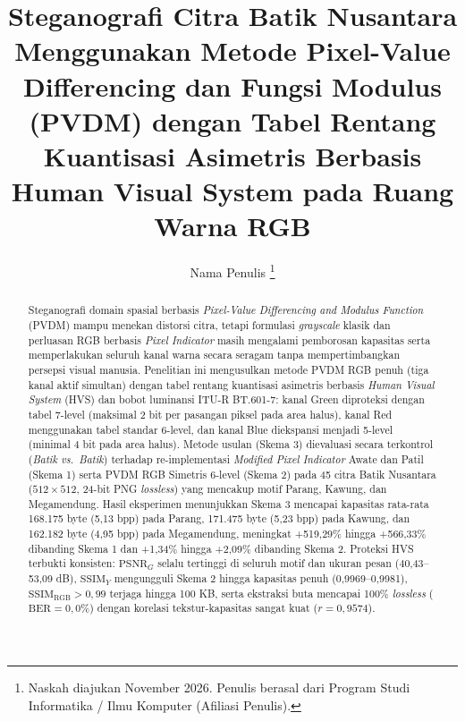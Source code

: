 \documentclass[12pt,journal]{IEEEtran}
\begin{document}
\title{Steganografi Citra Batik Nusantara Menggunakan Metode Pixel-Value Differencing dan Fungsi Modulus (PVDM) dengan Tabel Rentang Kuantisasi Asimetris Berbasis Human Visual System pada Ruang Warna RGB}

\author{Nama Penulis%
\thanks{Naskah diajukan November 2026. Penulis berasal dari Program Studi Informatika / Ilmu Komputer (Afiliasi Penulis).}}

\maketitle

\begin{abstract}
Steganografi domain spasial berbasis \textit{Pixel-Value Differencing and Modulus Function} (PVDM) mampu menekan distorsi citra, tetapi formulasi \textit{grayscale} klasik dan perluasan RGB berbasis \textit{Pixel Indicator} masih mengalami pemborosan kapasitas serta memperlakukan seluruh kanal warna secara seragam tanpa mempertimbangkan persepsi visual manusia. Penelitian ini mengusulkan metode PVDM RGB penuh (tiga kanal aktif simultan) dengan tabel rentang kuantisasi asimetris berbasis \textit{Human Visual System} (HVS) dan bobot luminansi ITU-R BT.601-7: kanal Green diproteksi dengan tabel 7-level (maksimal 2 bit per pasangan piksel pada area halus), kanal Red menggunakan tabel standar 6-level, dan kanal Blue diekspansi menjadi 5-level (minimal 4 bit pada area halus). Metode usulan (Skema 3) dievaluasi secara terkontrol (\textit{Batik vs.\ Batik}) terhadap re-implementasi \textit{Modified Pixel Indicator} Awate dan Patil (Skema 1) serta PVDM RGB Simetris 6-level (Skema 2) pada 45 citra Batik Nusantara ($512 \times 512$, 24-bit PNG \textit{lossless}) yang mencakup motif Parang, Kawung, dan Megamendung. Hasil eksperimen menunjukkan Skema 3 mencapai kapasitas rata-rata 168.175 byte (5,13 bpp) pada Parang, 171.475 byte (5,23 bpp) pada Kawung, dan 162.182 byte (4,95 bpp) pada Megamendung, meningkat +519,29\% hingga +566,33\% dibanding Skema 1 dan +1,34\% hingga +2,09\% dibanding Skema 2. Proteksi HVS terbukti konsisten: $\text{PSNR}_G$ selalu tertinggi di seluruh motif dan ukuran pesan (40,43--53,09 dB), $\text{SSIM}_Y$ mengungguli Skema 2 hingga kapasitas penuh (0,9969--0,9981), $\text{SSIM}_{\text{RGB}} > 0{,}99$ terjaga hingga 100 KB, serta ekstraksi buta mencapai 100\% \textit{lossless} ($\text{BER} = 0{,}0\%$) dengan korelasi tekstur-kapasitas sangat kuat ($r = 0{,}9574$).
\end{abstract}
\end{document}
